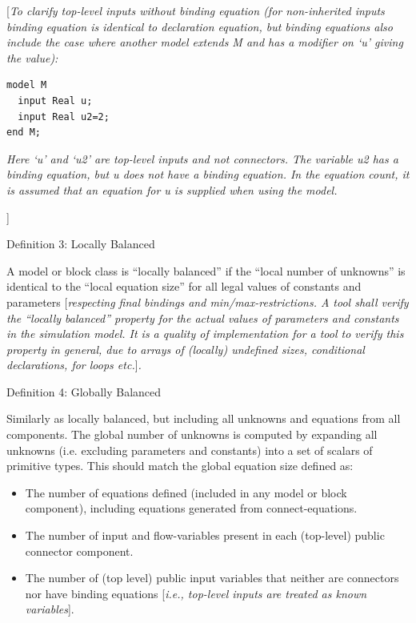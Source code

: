 \documentclass[10pt,a4paper]{report}
\begin{document}
{[}\emph{To clarify top-level inputs without binding equation (for
non-inherited inputs binding equation is identical to declaration
equation, but binding equations also include the case where another
model extends M and has a modifier on `u' giving the value):}

\begin{lstlisting}[language=modelica]
model M
  input Real u;
  input Real u2=2;
end M;
\end{lstlisting}

\emph{Here `u' and `u2' are top-level inputs and not connectors. The
variable u2 has a binding equation, but u does not have a binding
equation. In the equation count, it is assumed that an equation for u is
supplied when using the model.}

{]}

Definition 3: Locally Balanced

A model or block class is ``locally balanced'' if the ``local number of
unknowns'' is identical to the ``local equation size'' for all legal
values of constants and parameters {[}\emph{respecting final bindings
and min/max-restrictions. A tool shall verify the ``locally balanced''
property for the actual values of parameters and constants in the
simulation model. It is a quality of implementation for a tool to verify
this property in general, due to arrays of (locally) undefined sizes,
conditional declarations, for loops etc.}{]}\emph{.}

Definition 4: Globally Balanced

Similarly as locally balanced, but including all unknowns and equations
from all components. The global number of unknowns is computed by
expanding all unknowns (i.e. excluding parameters and constants) into a
set of scalars of primitive types. This should match the global equation
size defined as:

\begin{itemize}
\item
  The number of equations defined (included in any model or block
  component), including equations generated from connect-equations.
\item
  The number of input and flow-variables present in each (top-level)
  public connector component.
\item
  The number of (top level) public input variables that neither are
  connectors nor have binding equations {[}\emph{i.e., top-level inputs
  are treated as known variables}{]}.
\end{itemize}
\end{document}
